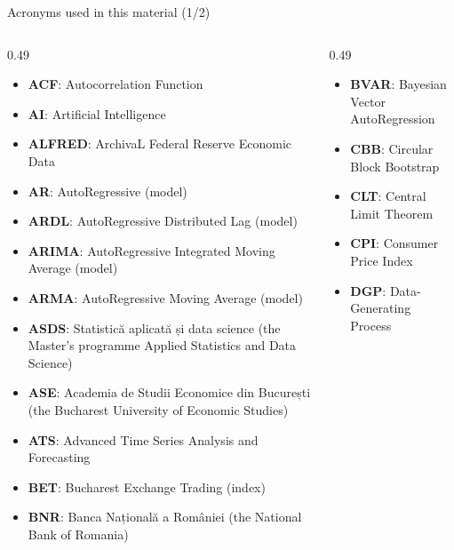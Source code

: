 {
\begin{frame}[noframenumbering]
    \titlepage
\end{frame}
}
\begin{frame}{Acronyms used in this material (1/2)}
\begin{columns}[T]
\begin{column}{0.49\textwidth}
\begin{itemize}\setlength{\itemsep}{0pt}
    \item \textbf{ACF}: Autocorrelation Function
    \item \textbf{AI}: Artificial Intelligence
    \item \textbf{ALFRED}: ArchivaL Federal Reserve Economic Data
    \item \textbf{AR}: AutoRegressive (model)
    \item \textbf{ARDL}: AutoRegressive Distributed Lag (model)
    \item \textbf{ARIMA}: AutoRegressive Integrated Moving Average (model)
    \item \textbf{ARMA}: AutoRegressive Moving Average (model)
    \item \textbf{ASDS}: Statistică aplicată și data science (the Master's programme Applied Statistics and Data Science)
    \item \textbf{ASE}: Academia de Studii Economice din București (the Bucharest University of Economic Studies)
    \item \textbf{ATS}: Advanced Time Series Analysis and Forecasting
    \item \textbf{BET}: Bucharest Exchange Trading (index)
    \item \textbf{BNR}: Banca Națională a României (the National Bank of Romania)
\end{itemize}
\end{column}
\begin{column}{0.49\textwidth}
\begin{itemize}\setlength{\itemsep}{0pt}
    \item \textbf{BVAR}: Bayesian Vector AutoRegression
    \item \textbf{CBB}: Circular Block Bootstrap
    \item \textbf{CLT}: Central Limit Theorem
    \item \textbf{CPI}: Consumer Price Index
    \item \textbf{DGP}: Data-Generating Process

\end{itemize}
\end{column}
\end{columns}
\end{frame}
